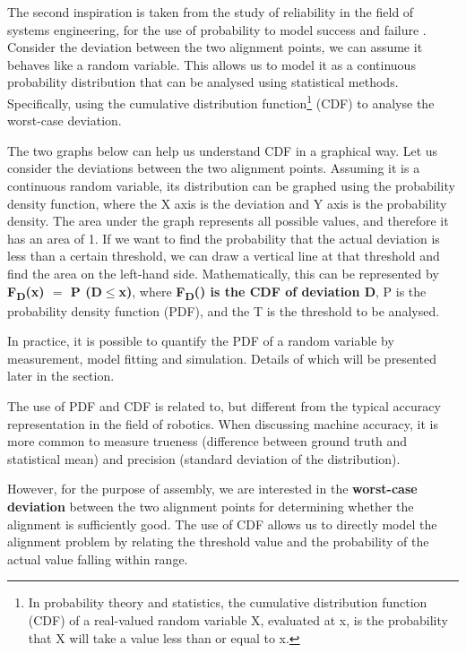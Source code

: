 The second inspiration is taken from the study of reliability in the field of systems engineering, for the use of probability to model success and failure \parencite{hallmannToleranceAllocationTolerancecost2020}. Consider the deviation between the two alignment points, we can assume it behaves like a random variable. This allows us to model it as a continuous probability distribution that can be analysed using statistical methods. Specifically, using the cumulative distribution function\footnote{ In probability theory and statistics, the cumulative distribution function (CDF) of a real-valued random variable X, evaluated at x, is the probability that X will take a value less than or equal to x. } (CDF) to analyse the worst-case deviation.

The two graphs below can help us understand CDF in a graphical way. Let us consider the deviations between the two alignment points. Assuming it is a continuous random variable, its distribution can be graphed using the probability density function, where the X axis is the deviation and Y axis is the probability density. The area under the graph represents all possible values, and therefore it has an area of 1. If we want to find the probability that the actual deviation is less than a certain threshold, we can draw a vertical line at that threshold and find the area on the left-hand side. Mathematically, this can be represented by \textbf{F\textsubscript{D}(x) $=$ P (D$\leq$x)}, where \textbf{F\textsubscript{D}() is the CDF of deviation D}, P is the probability density function (PDF), and the T is the threshold to be analysed.

In practice, it is possible to quantify the PDF of a random variable by measurement, model fitting and simulation. Details of which will be presented later in the section.



The use of PDF and CDF is related to, but different from the typical accuracy representation in the field of robotics. When discussing machine accuracy, it is more common to measure trueness (difference between ground truth and statistical mean) and precision (standard deviation of the distribution). 

However, for the purpose of assembly, we are interested in the \textbf{worst-case deviation }between the two alignment points for determining whether the alignment is sufficiently good. The use of CDF allows us to directly model the alignment problem by relating the threshold value and the probability of the actual value falling within range. 

